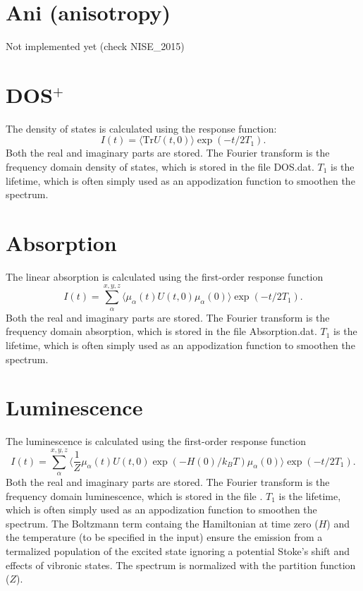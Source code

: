 \section{Ani (anisotropy)}
Not implemented yet (check NISE\_2015)
\section{DOS$^{+}$}
The density of states is calculated using the response function:
\begin{equation}
	I(t)=\langle\textrm{Tr}U(t,0)\rangle\exp(-t/2T_1).
\end{equation}
Both the real and imaginary parts are stored. The Fourier transform is the frequency domain density of states, which is stored in the file DOS.dat. $T_1$ is the lifetime, which is often simply used as an appodization function to smoothen the spectrum.
\section{Absorption}
The linear absorption is calculated using the first-order response function \cite{Duan_2015}
\begin{equation}
	I(t)=\sum_{\alpha}^{x,y,z}\langle\mu_{\alpha}(t)U(t,0)\mu_{\alpha}(0)\rangle\exp(-t/2T_1).
\end{equation}
Both the real and imaginary parts are stored. The Fourier transform is the frequency domain absorption, which is stored in the file Absorption.dat. $T_1$ is the lifetime, which is often simply used as an appodization function to smoothen the spectrum. 
\section{Luminescence}
The luminescence is calculated using the first-order response function
\begin{equation}
	I(t)=\sum_{\alpha}^{x,y,z}\langle\frac{1}{Z}\mu_{\alpha}(t)U(t,0)\exp(-H(0)/k_BT)\mu_{\alpha}(0)\rangle\exp(-t/2T_1).
\end{equation}
Both the real and imaginary parts are stored.
The Fourier transform is the frequency domain luminescence, which is stored in the file .
$T_1$ is the lifetime, which is often simply used as an appodization function to smoothen the spectrum.
The Boltzmann term containg the Hamiltonian at time zero ($H$) and the temperature (to be specified in the input) ensure the emission from a termalized population of the excited state ignoring a potential Stoke's shift and effects of vibronic states.
The spectrum is normalized with the partition function ($Z$). 
